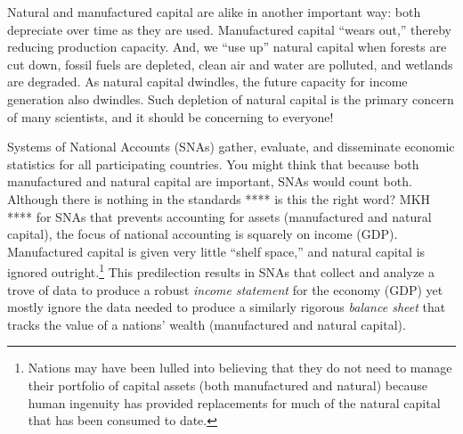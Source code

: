 Natural and manufactured capital are alike in another important way:
both depreciate over time as they are used.
Manufactured capital ``wears out,'' thereby reducing production capacity. 
And, we ``use up'' natural capital when forests are cut
down, fossil fuels are depleted, clean air and water are polluted, 
and wetlands are degraded. 
As natural capital dwindles, the future
capacity for income generation also dwindles. 
Such depletion of natural capital is the primary concern of many scientists, 
and it should be concerning to everyone!


Systems of National Accounts (SNAs) gather, evaluate, and disseminate 
economic statistics for all participating countries.
You might think that because both manufactured and natural capital are important,
SNAs would count both.
Although there is nothing in the standards **** is this the right word? MKH ****
for SNAs that prevents 
accounting for assets (manufactured and natural capital),
the focus of national accounting is squarely on income (GDP).
Manufactured capital is given very little ``shelf space,'' 
and natural capital is ignored outright.\footnote{Nations 
	may have been lulled into believing that they 
	do not need to manage their portfolio of capital assets 
	(both manufactured and natural)
	because human ingenuity has provided replacements for much of the
	natural capital that has been consumed to date.}
This predilection results in SNAs that collect and analyze a trove of data to
produce a robust \emph{income statement} for the economy (GDP)
yet mostly ignore the data needed to produce a similarly rigorous
\emph{balance sheet} that tracks the value 
of a nations' wealth (manufactured and natural capital). 

